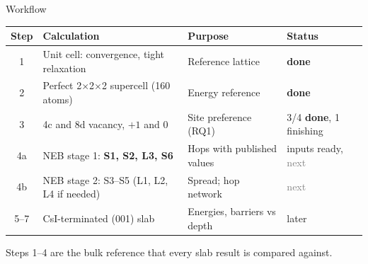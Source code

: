 \documentclass[aspectratio=169,10pt]{beamer}
\newcommand{\done}{\textcolor{cs}{\textbf{done}}}
\newcommand{\nxt}{\textcolor{gray}{next}}
\begin{document}
\begin{frame}{Workflow}
  \footnotesize
  \begin{tabular}{clll}
    \toprule
    Step & Calculation & Purpose & Status \\
    \midrule
    1 & Unit cell: convergence, tight relaxation & Reference lattice & \done \\
    2 & Perfect 2$\times$2$\times$2 supercell (160 atoms) & Energy reference & \done \\
    3 & 4c and 8d vacancy, $+1$ and 0 & Site preference (RQ1) & 3/4 \done, 1 finishing \\
    4a & NEB stage 1: \textbf{S1, S2, L3, S6} & Hops with published values & inputs ready, \nxt \\
    4b & NEB stage 2: S3--S5 (L1, L2, L4 if needed) & Spread; hop network & \nxt \\
    5--7 & CsI-terminated (001) slab & Energies, barriers vs depth & later \\
    \bottomrule
  \end{tabular}

  \vspace{0.8em}
  Steps 1--4 are the bulk reference that every slab result is compared against.
\end{frame}
\end{document}
